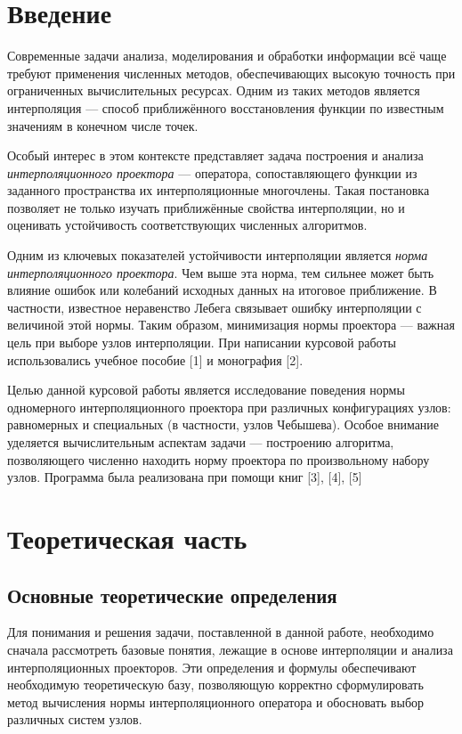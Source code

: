 \documentclass[14pt,openany,a4paper,oneside]{extarticle}
\begin{document}
	\newpage
	\section*{Введение}
	Современные задачи анализа, моделирования и обработки информации всё чаще требуют применения численных методов, обеспечивающих высокую точность при ограниченных вычислительных ресурсах. Одним из таких методов является интерполяция — способ приближённого восстановления функции по известным значениям в конечном числе точек.
	
	Особый интерес в этом контексте представляет задача построения и анализа \textit{интерполяционного проектора} — оператора, сопоставляющего функции из заданного пространства их интерполяционные многочлены. Такая постановка позволяет не только изучать приближённые свойства интерполяции, но и оценивать устойчивость соответствующих численных алгоритмов.
	
	Одним из ключевых показателей устойчивости интерполяции является \textit{норма интерполяционного проектора}. Чем выше эта норма, тем сильнее может быть влияние ошибок или колебаний исходных данных на итоговое приближение. В частности, известное неравенство Лебега связывает ошибку интерполяции с величиной этой нормы. Таким образом, минимизация нормы проектора — важная цель при выборе узлов интерполяции. При написании курсовой
	работы использовались учебное пособие [1] и монография [2].
	
	Целью данной курсовой работы является исследование поведения нормы одномерного интерполяционного проектора при различных конфигурациях узлов: равномерных и специальных (в частности, узлов Чебышева). Особое внимание уделяется вычислительным аспектам задачи — построению алгоритма, позволяющего численно находить норму проектора по произвольному набору узлов. Программа была реализована при помощи книг [3], [4], [5]
	
	\newpage
	\section{Теоретическая часть}
	\subsection{Основные теоретические определения}
	Для понимания и решения задачи, поставленной в данной работе, необходимо сначала рассмотреть базовые понятия, лежащие в основе интерполяции и анализа интерполяционных проекторов. Эти определения и формулы обеспечивают необходимую теоретическую базу, позволяющую корректно сформулировать метод вычисления нормы интерполяционного оператора и обосновать выбор различных систем узлов.
	
\end{document}
